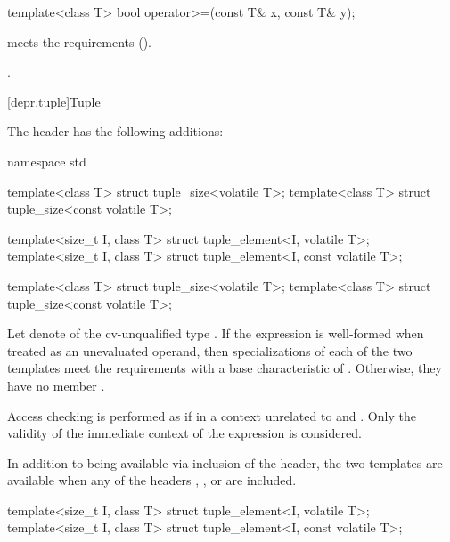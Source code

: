 %
\begin{itemdecl}
template<class T> bool operator>=(const T& x, const T& y);
\end{itemdecl}

\begin{itemdescr}
\pnum
\expects
{} meets the  requirements ().

\pnum
\returns
{}.
\end{itemdescr}

[depr.tuple]{Tuple}

\pnum
The header  has the following additions:

\begin{codeblock}
namespace std {
  template<class T> struct tuple_size<volatile T>;
  template<class T> struct tuple_size<const volatile T>;

  template<size_t I, class T> struct tuple_element<I, volatile T>;
  template<size_t I, class T> struct tuple_element<I, const volatile T>;
}
\end{codeblock}

\begin{itemdecl}
template<class T> struct tuple_size<volatile T>;
template<class T> struct tuple_size<const volatile T>;
\end{itemdecl}

\begin{itemdescr}
\pnum
Let  denote  of the cv-unqualified type .
If the expression  is well-formed
when treated as an unevaluated operand,
then specializations of each of the two templates meet
the  requirements with a base characteristic of
.
Otherwise, they have no member .

\pnum
Access checking is performed as if
in a context unrelated to  and .
Only the validity of the immediate context of the expression is considered.

\pnum
In addition to being available via inclusion of the  header,
the two templates are available when any of the headers
,
, or
are included.
\end{itemdescr}

\begin{itemdecl}
template<size_t I, class T> struct tuple_element<I, volatile T>;
template<size_t I, class T> struct tuple_element<I, const volatile T>;
\end{itemdecl}

